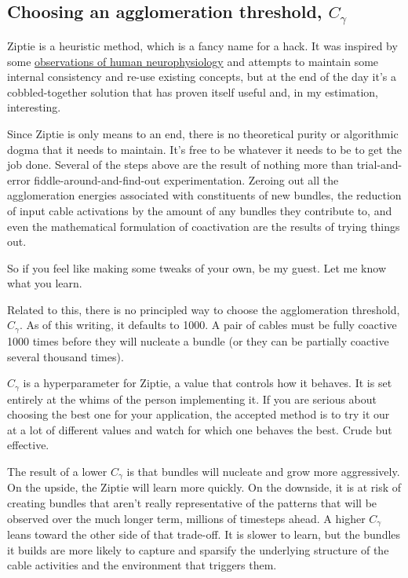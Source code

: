 \subsection{Choosing an agglomeration threshold, $C_\gamma$}
\label{subsec:algochoosingthreshold}

Ziptie is a heuristic method, which is a fancy name for a hack.
It was inspired by some 
\hyperref[sec:bio]{observations of human neurophysiology} and
attempts to maintain some internal consistency and re-use existing
concepts, but at the end of the day it's a cobbled-together solution
that has proven itself useful and, in my estimation, interesting.

Since Ziptie is only means to an end, there is no theoretical purity
or algorithmic dogma that it needs to maintain. It's free to be
whatever it needs to be to get the job done. Several of the
steps above are the result of nothing more than trial-and-error
fiddle-around-and-find-out experimentation. Zeroing out all the
agglomeration energies associated with constituents of new bundles,
the reduction of input cable activations by the amount of
any bundles they contribute to, and even the mathematical
formulation of coactivation are the results of trying things out.

So if you feel like making some tweaks of your own, be my guest.
Let me know what you learn.

Related to this, there is no principled way to choose the agglomeration
threshold, $C_\gamma$. As of this writing, it defaults to 1000. A pair
of cables must be fully coactive 1000 times before they will nucleate a
bundle (or they can be partially coactive several thousand times).

$C_\gamma$ is a hyperparameter for Ziptie, a value that controls how
it behaves. It is set entirely at the whims of the person implementing it.
If you are serious about choosing the best one for your application,
the accepted method is to try it our at a lot of different values and
watch for which one behaves the best. Crude but effective.

The result of a lower $C_\gamma$ is that bundles will nucleate and grow
more aggressively. On the upside, the Ziptie will learn more quickly.
On the downside, it is at risk of creating bundles that aren't really
representative of the patterns that will be observed over the much longer
term, millions of timesteps ahead. A higher $C_\gamma$ leans toward the
other side of that trade-off. It is slower to learn, but the bundles it
builds are more likely to capture and sparsify the underlying structure
of the cable activities and the environment that triggers them.

